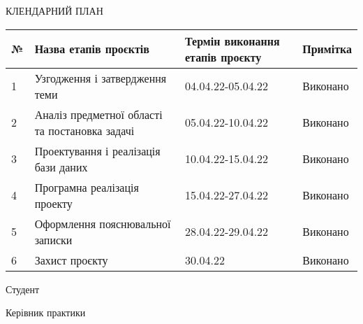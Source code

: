 {
    \setlength\parindent{0pt}

    \begin{center}
        \uppercase{Клендарний план}
    \end{center}

    \begin{tabular}{ | m{0.5cm} | m{8.4cm}| m{4cm} | m{2.2cm} | } 
        \hline
        № & Назва етапів проєктів & Термін виконання етапів проєкту & Примітка \\
        \hline
        1 & Узгодження і затвердження теми & 04.04.22-05.04.22 & Виконано\\
        \hline
        2 & Аналіз предметної області та постановка задачі
        & 05.04.22-10.04.22  & Виконано\\
        \hline
        3 & Проектування і реалізація бази даних & 10.04.22-15.04.22  & Виконано\\
        \hline
        4 & Програмна реалізація проекту & 15.04.22-27.04.22  & Виконано\\
        \hline
        5 & Оформлення пояснювальної записки & 28.04.22-29.04.22  & Виконано\\
        \hline
        6 & Захист проєкту & 30.04.22 & Виконано\\
        \hline
    \end{tabular}

    \vspace{8ex}

    \hfill

    \hspace{1cm}
    \begin{minipage}{9em}
            Студент
            \vspace{\baselineskip}

            Керівник практики

    \end{minipage}
    \begin{minipage}{12cm}

         \hspace{2em}
        \wideunderline[10em]{\StundentName} 
        \hfill
        \vspace{\baselineskip}

         \hspace{2em}
        \wideunderline[10em]{\ScientificDirectorName} 
        \hfill

\end{minipage}
    

}
